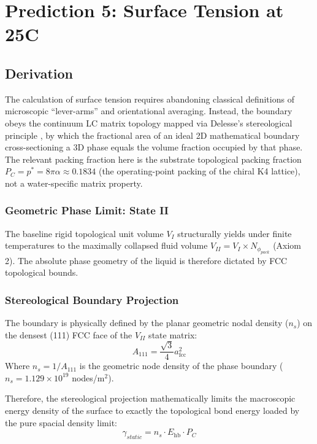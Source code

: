 \section{Prediction 5: Surface Tension at 25\textdegree{}C}

\subsection{Derivation}

The calculation of surface tension requires abandoning classical definitions of microscopic ``lever-arms'' and orientational averaging. Instead, the boundary obeys the continuum LC matrix topology mapped via Delesse's stereological principle \cite{delesse1847procede}, by which the fractional area of an ideal 2D mathematical boundary cross-sectioning a 3D phase equals the volume fraction occupied by that phase. The relevant packing fraction here is the substrate topological packing fraction $P_C = p^* = 8\pi\alpha \approx 0.1834$ (the operating-point packing of the chiral K4 lattice), not a water-specific matrix property.

\subsubsection{Geometric Phase Limit: State II}

The baseline rigid topological unit volume $V_I$ structurally yields under finite temperatures to the maximally collapsed fluid volume $V_{II} = V_I \times N_{\phi_{pack}}$ (Axiom 2). The absolute phase geometry of the liquid is therefore dictated by FCC topological bounds.

\subsubsection{Stereological Boundary Projection}

The boundary is physically defined by the planar geometric nodal density ($n_s$) on the densest (111) FCC face of the $V_{II}$ state matrix:
\begin{equation}
    A_{111} = \frac{\sqrt{3}}{4} a_\mathrm{fcc}^2
\end{equation}
Where $n_s = 1 / A_{111}$ is the geometric node density of the phase boundary ($n_s = 1.129 \times 10^{19}$ nodes/m$^2$).

Therefore, the stereological projection mathematically limits the macroscopic energy density of the surface to exactly the topological bond energy loaded by the pure spacial density limit:
\begin{equation}
\boxed{
    \gamma_{static} = n_s \cdot E_\mathrm{hb} \cdot P_C 
}
\end{equation}

